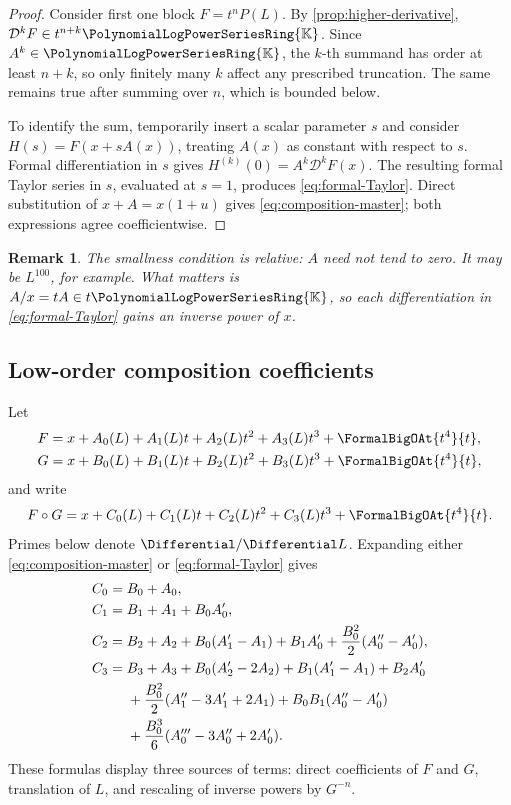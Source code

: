 \documentclass[11pt]{article}
\theoremstyle{pltheorem}
\newtheorem{remark}[theorem]{Remark}
\newcommand{\K}{\mathbb K}
\newcommand{\PL}{\PolynomialLogPowerSeriesRing{\K}}
\newcommand{\D}{\mathcal D}
\newcommand{\compose}{\mathbin{\circ}}
\begin{document}
\begin{proof}
Consider first one block \(F=t^nP(L)\).  By
\cref{prop:higher-derivative}, \(\D^kF\in t^{n+k}\PL\).  Since
\(A^k\in\PL\), the \(k\)-th summand has order at least \(n+k\), so only finitely many \(k\) affect any prescribed truncation.  The same remains true after summing over \(n\), which is bounded below.

To identify the sum, temporarily insert a scalar parameter \(s\) and consider
\(H(s)=F(x+sA(x))\), treating \(A(x)\) as constant with respect to \(s\).  Formal differentiation in \(s\) gives
\(H^{(k)}(0)=A^k\D^kF(x)\).  The resulting formal Taylor series in \(s\), evaluated at \(s=1\), produces \cref{eq:formal-Taylor}.  Direct substitution of
\(x+A=x(1+u)\) gives \cref{eq:composition-master}; both expressions agree coefficientwise.
\end{proof}

\begin{remark}
The smallness condition is relative: \(A\) need not tend to zero.  It may be \(L^{100}\), for example.  What matters is \(A/x=tA\in t\PL\), so each differentiation in \cref{eq:formal-Taylor} gains an inverse power of \(x\).
\end{remark}

\subsection{Low-order composition coefficients}

Let
\begin{align}
 F&=x+A_0(L)+A_1(L)t+A_2(L)t^2+A_3(L)t^3+\FormalBigOAt{t^4}{t},
 \label{eq:F-near-low}\\
 G&=x+B_0(L)+B_1(L)t+B_2(L)t^2+B_3(L)t^3+\FormalBigOAt{t^4}{t},
 \label{eq:G-near-low}
\end{align}
and write
\begin{equation}\label{eq:H-near-low}
 F\compose G=x+C_0(L)+C_1(L)t+C_2(L)t^2+C_3(L)t^3+\FormalBigOAt{t^4}{t}.
\end{equation}
Primes below denote \(\Differential/\Differential L\).  Expanding either
\cref{eq:composition-master} or \cref{eq:formal-Taylor} gives
\begin{align}
 C_0={}&B_0+A_0,\label{eq:C0-compose}\\
 C_1={}&B_1+A_1+B_0A_0',\label{eq:C1-compose}\\
 C_2={}&B_2+A_2+B_0(A_1'-A_1)+B_1A_0'
 +\frac{B_0^2}{2}(A_0''-A_0'),\label{eq:C2-compose}\\
 C_3={}&B_3+A_3+B_0(A_2'-2A_2)+B_1(A_1'-A_1)+B_2A_0'
 \notag\\
 &+\frac{B_0^2}{2}(A_1''-3A_1'+2A_1)
 +B_0B_1(A_0''-A_0')\notag\\
 &+\frac{B_0^3}{6}(A_0'''-3A_0''+2A_0').
 \label{eq:C3-compose}
\end{align}
These formulas display three sources of terms: direct coefficients of \(F\) and \(G\), translation of \(L\), and rescaling of inverse powers by \(G^{-n}\).
\end{document}
